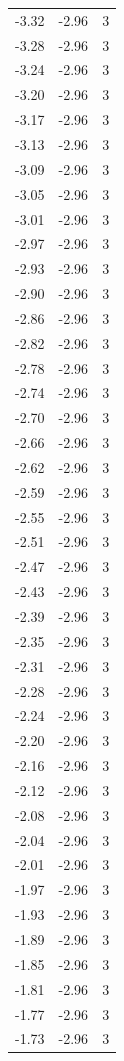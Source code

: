 \begin{longtable}{lrr}
  -3.32 & -2.96 & 3 \\
  -3.28 & -2.96 & 3 \\
  -3.24 & -2.96 & 3 \\
  -3.20 & -2.96 & 3 \\
  -3.17 & -2.96 & 3 \\
  -3.13 & -2.96 & 3 \\
  -3.09 & -2.96 & 3 \\
  -3.05 & -2.96 & 3 \\
  -3.01 & -2.96 & 3 \\
  -2.97 & -2.96 & 3 \\
  -2.93 & -2.96 & 3 \\
  -2.90 & -2.96 & 3 \\
  -2.86 & -2.96 & 3 \\
  -2.82 & -2.96 & 3 \\
  -2.78 & -2.96 & 3 \\
  -2.74 & -2.96 & 3 \\
  -2.70 & -2.96 & 3 \\
  -2.66 & -2.96 & 3 \\
  -2.62 & -2.96 & 3 \\
  -2.59 & -2.96 & 3 \\
  -2.55 & -2.96 & 3 \\
  -2.51 & -2.96 & 3 \\
  -2.47 & -2.96 & 3 \\
  -2.43 & -2.96 & 3 \\
  -2.39 & -2.96 & 3 \\
  -2.35 & -2.96 & 3 \\
  -2.31 & -2.96 & 3 \\
  -2.28 & -2.96 & 3 \\
  -2.24 & -2.96 & 3 \\
  -2.20 & -2.96 & 3 \\
  -2.16 & -2.96 & 3 \\
  -2.12 & -2.96 & 3 \\
  -2.08 & -2.96 & 3 \\
  -2.04 & -2.96 & 3 \\
  -2.01 & -2.96 & 3 \\
  -1.97 & -2.96 & 3 \\
  -1.93 & -2.96 & 3 \\
  -1.89 & -2.96 & 3 \\
  -1.85 & -2.96 & 3 \\
  -1.81 & -2.96 & 3 \\
  -1.77 & -2.96 & 3 \\
  -1.73 & -2.96 & 3 \\

\end{longtable}
